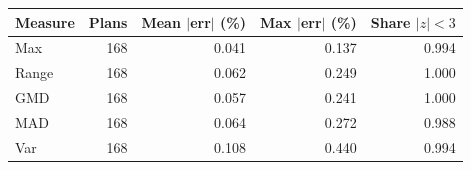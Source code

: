 \begin{tabular}{lrrrr}\toprule
Measure & Plans & Mean $|$err$|$ (\%) & Max $|$err$|$ (\%) & Share $|z|<3$ \\
\midrule
Max & 168 & 0.041 & 0.137 & 0.994 \\
Range & 168 & 0.062 & 0.249 & 1.000 \\
GMD & 168 & 0.057 & 0.241 & 1.000 \\
MAD & 168 & 0.064 & 0.272 & 0.988 \\
Var & 168 & 0.108 & 0.440 & 0.994 \\
\bottomrule
\end{tabular}
